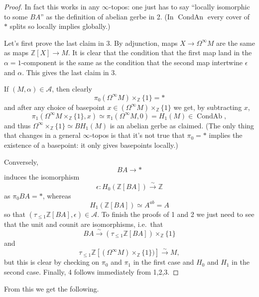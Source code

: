 \documentclass[12pt]{article}
\theoremstyle{definition}
\newcommand{\on}{\operatorname}
\newcommand{\mc}{\mathcal}
\newcommand{\mbb}{\mathbb}
\begin{document}
\begin{proof}
In fact this works in any $\infty$-topos: one just has to say ``locally isomorphic to some $BA$'' as the definition of abelian gerbe in 2.  (In $\on{CondAn}$ every cover of $\ast$ splits so locally implies globally.)

Let's first prove the last claim in 3.  By adjunction, maps $X\to \Omega^\infty M$ are the same as maps $\mbb{Z}[X] \to M$.  It is clear that the condition that the first map land in the $\alpha=1$-component is the same as the condition that the second map intertwine $\epsilon$ and $\alpha$.  This gives the last claim in 3.

If $(M,\alpha)\in\mc{A}$, then clearly
$$\pi_0 (\Omega^\infty M)\times_{\mbb{Z}}\{1\} = \ast$$
and after any choice of basepoint $x\in (\Omega^\infty M)\times_{\mbb{Z}}\{1\}$ we get, by subtracting $x$,
$$\pi_1(\Omega^\infty M\times_{\mbb{Z}}\{1\},x)\simeq \pi_1(\Omega^\infty M,0) = H_1(M)\in \on{CondAb},$$
and thus $\Omega^\infty\times_{\mbb{Z}}\{1\}\simeq BH_1(M)$ is an abelian gerbe as claimed.  (The only thing that changes in a general $\infty$-topos is that it's not true that $\pi_0=\ast$ implies the existence of a basepoint: it only gives basepoints locally.)

Conversely,
$$BA \to \ast$$
induces the isomorphism 
$$\epsilon: H_0(\mbb{Z}[BA])\overset{\sim}{
\rightarrow} \mbb{Z}$$
as $\pi_0 BA=\ast$, whereas
$$H_1(\mbb{Z}[BA])\simeq A^{ab}=A$$
so that $(\tau_{\leq 1}\mbb{Z}[BA],\epsilon)\in\mc{A}$.  To finish the proofs of 1 and 2 we just need to see that the unit and counit are isomorphisms, i.e.\ that
$$BA\overset{\sim}{\rightarrow}(\tau_{\leq 1}\mbb{Z}[BA])\times_{\mbb{Z}}\{1\}$$
and
$$\tau_{\leq 1}\mbb{Z}[(\Omega^\infty M)\times_{\mbb{Z}}\{1\})]\overset{\sim}{\rightarrow} M,$$
but this is clear by checking on $\pi_0$ and $\pi_1$ in the first case and $H_0$ and $H_1$ in the second case.  Finally, 4 follows immediately from 1,2,3.\end{proof}

From this we get the following.
\end{document}

